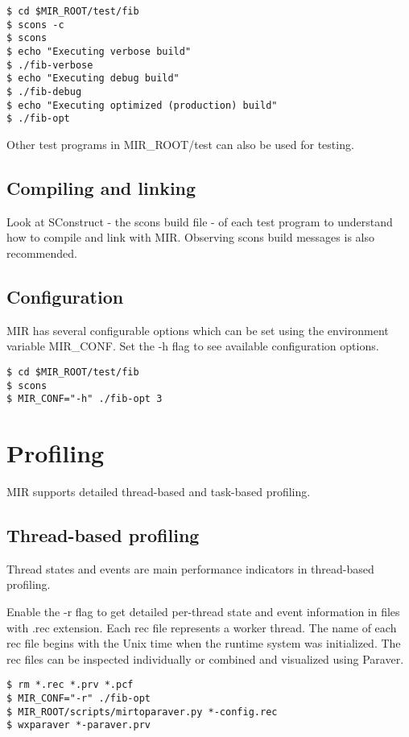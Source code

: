 \documentclass[11pt,a4paper,notitlepage]{article}
\begin{document}
\begin{lstlisting}[style=BashInputStyle]
$ cd $MIR_ROOT/test/fib
$ scons -c
$ scons
$ echo "Executing verbose build"
$ ./fib-verbose
$ echo "Executing debug build"
$ ./fib-debug
$ echo "Executing optimized (production) build"
$ ./fib-opt
\end{lstlisting}

Other test programs in MIR\_ROOT/test can also be used for testing.

\subsection{Compiling and linking}
Look at SConstruct - the scons build file - of each test program to understand how to compile and link with MIR. Observing scons build messages is also recommended.

\subsection{Configuration}
MIR has several configurable options which can be set using the environment variable MIR\_CONF. Set the -h flag to see available configuration options.

\begin{lstlisting}[style=BashInputStyle]
$ cd $MIR_ROOT/test/fib
$ scons 
$ MIR_CONF="-h" ./fib-opt 3
\end{lstlisting}

\section{Profiling}
MIR supports detailed thread-based and task-based profiling.

\subsection{Thread-based profiling}
Thread states and events are main performance indicators in thread-based profiling. 

Enable the -r flag to get detailed per-thread state and event information in files with .rec extension.
Each rec file represents a worker thread.
The name of each rec file begins with the Unix time when the runtime system was initialized.
The rec files can be inspected individually or combined and visualized using Paraver.

\begin{lstlisting}[style=BashInputStyle]
$ rm *.rec *.prv *.pcf
$ MIR_CONF="-r" ./fib-opt
$ MIR_ROOT/scripts/mirtoparaver.py *-config.rec 
$ wxparaver *-paraver.prv
\end{lstlisting}
\end{document}
